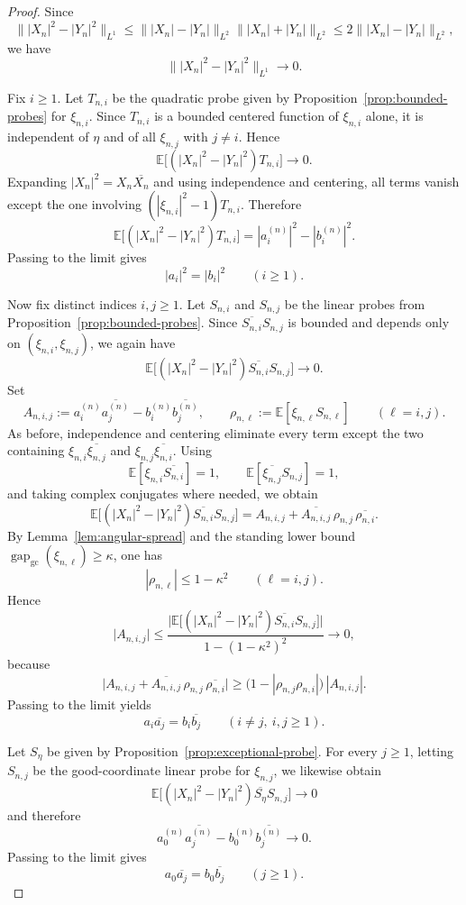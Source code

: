 \documentclass[11pt]{amsart}
\newcommand{\E}{\mathbb{E}}
\newcommand{\gapgc}{\operatorname{gap}_{\mathrm{gc}}}
\begin{document}
\begin{proof}
Since
\[
  \bigl\||X_n|^2-|Y_n|^2\bigr\|_{L^1}
  \le
  \bigl\||X_n|-|Y_n|\bigr\|_{L^2}
  \bigl\||X_n|+|Y_n|\bigr\|_{L^2}
  \le
  2\bigl\||X_n|-|Y_n|\bigr\|_{L^2},
\]
we have
\[
  \bigl\||X_n|^2-|Y_n|^2\bigr\|_{L^1}\longrightarrow 0.
\]

Fix $i\ge 1$.  Let $T_{n,i}$ be the quadratic probe given by
Proposition~\ref{prop:bounded-probes} for $\xi_{n,i}$.  Since $T_{n,i}$ is a
bounded centered function of $\xi_{n,i}$ alone, it is independent of $\eta$ and
of all $\xi_{n,j}$ with $j\ne i$.  Hence
\[
  \E\bigl[(|X_n|^2-|Y_n|^2)T_{n,i}\bigr]\longrightarrow 0.
\]
Expanding $|X_n|^2=X_n\overline{X_n}$ and using independence and centering, all
terms vanish except the one involving $(|\xi_{n,i}|^2-1)T_{n,i}$.  Therefore
\[
  \E\bigl[(|X_n|^2-|Y_n|^2)T_{n,i}\bigr]
  =
  |a_i^{(n)}|^2-|b_i^{(n)}|^2.
\]
Passing to the limit gives
\[
  |a_i|^2=|b_i|^2
  \qquad (i\ge 1).
\]

Now fix distinct indices $i,j\ge 1$.  Let $S_{n,i}$ and $S_{n,j}$ be the linear
probes from Proposition~\ref{prop:bounded-probes}.  Since
$\overline{S_{n,i}}S_{n,j}$ is bounded and depends only on
$(\xi_{n,i},\xi_{n,j})$, we again have
\[
  \E\bigl[(|X_n|^2-|Y_n|^2)\overline{S_{n,i}}S_{n,j}\bigr]\longrightarrow 0.
\]
Set
\[
  A_{n,i,j}:=
  a_i^{(n)}\overline{a_j^{(n)}}-b_i^{(n)}\overline{b_j^{(n)}},
  \qquad
  \rho_{n,\ell}:=\E[\xi_{n,\ell}S_{n,\ell}]
  \qquad (\ell=i,j).
\]
As before, independence and centering eliminate every term except the two
containing $\xi_{n,i}\overline{\xi_{n,j}}$ and $\xi_{n,j}\overline{\xi_{n,i}}$.
Using
\[
  \E[\xi_{n,i}\overline{S_{n,i}}]=1,
  \qquad
  \E[\overline{\xi_{n,j}}S_{n,j}]=1,
\]
and taking complex conjugates where needed, we obtain
\[
  \E\bigl[(|X_n|^2-|Y_n|^2)\overline{S_{n,i}}S_{n,j}\bigr]
  =
  A_{n,i,j}
  +
  \overline{A_{n,i,j}}\,\rho_{n,j}\,\overline{\rho_{n,i}}.
\]
By Lemma~\ref{lem:angular-spread} and the standing lower bound
$\gapgc(\xi_{n,\ell})\ge\kappa$, one has
\[
  |\rho_{n,\ell}|
  \le
  1-\kappa^2
  \qquad (\ell=i,j).
\]
Hence
\[
  \bigl|A_{n,i,j}\bigr|
  \le
  \frac{
    \bigl|\E\bigl[(|X_n|^2-|Y_n|^2)\overline{S_{n,i}}S_{n,j}\bigr]\bigr|
  }{
    1-(1-\kappa^2)^2
  }
  \longrightarrow 0,
\]
because
\[
  \bigl|A_{n,i,j}
  +
  \overline{A_{n,i,j}}\,\rho_{n,j}\,\overline{\rho_{n,i}}\bigr|
  \ge
  \bigl(1-|\rho_{n,j}\rho_{n,i}|\bigr)\,|A_{n,i,j}|.
\]
Passing to the limit yields
\[
  a_i\overline{a_j}=b_i\overline{b_j}
  \qquad (i\ne j,\ i,j\ge 1).
\]

Let $S_\eta$ be given by Proposition~\ref{prop:exceptional-probe}.  For every
$j\ge 1$, letting $S_{n,j}$ be the good-coordinate linear probe for $\xi_{n,j}$,
we likewise obtain
\[
  \E\bigl[(|X_n|^2-|Y_n|^2)\overline{S_\eta}S_{n,j}\bigr]\longrightarrow 0
\]
and therefore
\[
  a_0^{(n)}\overline{a_j^{(n)}}-b_0^{(n)}\overline{b_j^{(n)}}\longrightarrow 0.
\]
Passing to the limit gives
\[
  a_0\overline{a_j}=b_0\overline{b_j}
  \qquad (j\ge 1).
\]


\end{proof}
\end{document}
